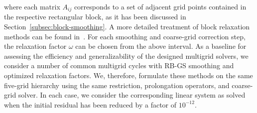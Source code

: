 where each matrix $A_{ij}$ corresponds to a set of adjacent grid points contained in the respective rectangular block, as it has been discussed in Section~\ref{subsec:block-smoothing}.
A more detailed treatment of block relaxation methods can be found in~\cite{trottenberg2000multigrid}.
For each smoothing and coarse-grid correction step, the relaxation factor $\omega$ can be chosen from the above interval.
As a baseline for assessing the efficiency and generalizability of the designed multigrid solvers, we consider a number of common multigrid cycles with RB-GS smoothing and optimized relaxation factors.
We, therefore, formulate these methods on the same five-grid hierarchy using the same restriction, prolongation operators, and coarse-grid solver.
In each case, we consider the corresponding linear system as solved when the initial residual has been reduced by a factor of $10^{-12}$.

